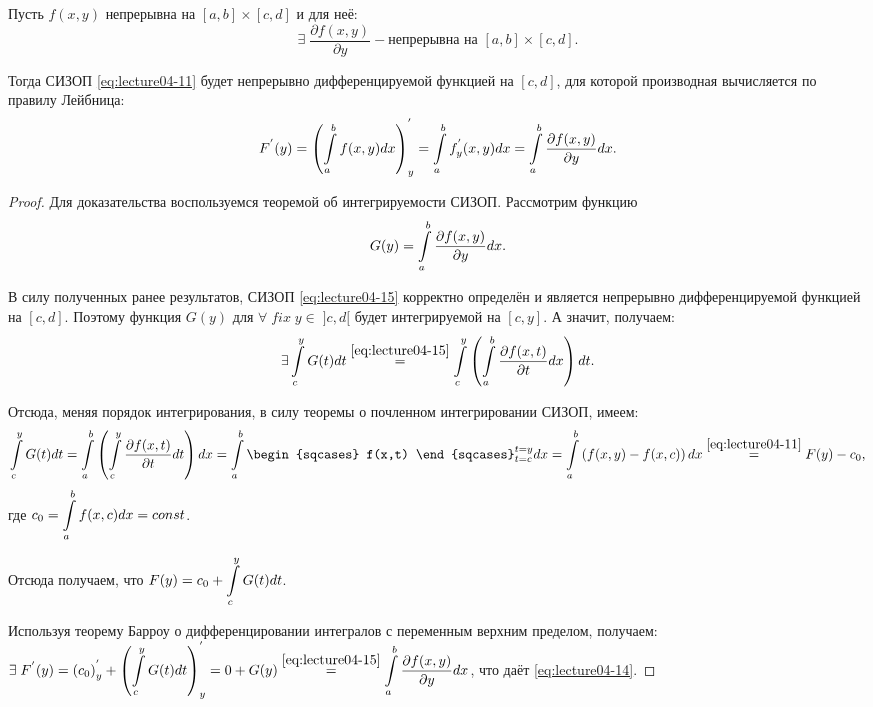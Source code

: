 \begin{col-answer-preambule}
\end{col-answer-preambule}

\begin{theorem}
	Пусть $f(x,y)$ непрерывна на $[a,b] \times [c,d]$ и для неё:
	\begin{equation*}
	\exists \; \dfrac{\partial f(x,y)}{\partial y} - \text{непрерывна на $[a,b] \times [c,d]$}.
	\end{equation*}
	
	Тогда СИЗОП \eqref{eq:lecture04-11} будет непрерывно дифференцируемой функцией на $[c,d]$, для которой производная вычисляется по правилу Лейбница:
	\begin{equation}
	\label{eq:lecture04-14}
	F^{'}(y) = \left(\displaystyle\int\limits_a^b f(x,y) dx\right)^{'}_y = \displaystyle\int\limits_a^b f^{'}_{y}(x,y)dx = \displaystyle\int\limits_a^b \dfrac{\partial f(x,y)}{\partial y} dx.
	\end{equation}
\end{theorem}
\begin{proof}
	Для доказательства воспользуемся теоремой об интегрируемости СИЗОП. Рассмотрим функцию
	\begin{equation}
	\label{eq:lecture04-15}
	G(y) = \displaystyle\int\limits_a^b \dfrac{\partial f(x,y)}{\partial y} dx.
	\end{equation}
	
	В силу полученных ранее результатов, СИЗОП \eqref{eq:lecture04-15} корректно определён и является непрерывно дифференцируемой функцией на $[c,d]$. Поэтому функция $G(y)$ для $\forall \; fix \; y \in \; ]c,d[$ будет интегрируемой на $[c,y]$. А значит, получаем:
	\begin{equation*}
	\exists \displaystyle\int\limits_c^y G(t)dt \overset{\eqref{eq:lecture04-15}}{=} \displaystyle\int\limits_c^y \left(\displaystyle\int\limits_a^b  \dfrac{\partial f(x,t)}{\partial t} dx \right) dt.
	\end{equation*}
	
	Отсюда, меняя порядок интегрирования, в силу теоремы о почленном интегрировании СИЗОП, имеем:
	\begin{equation*}
	\dintl_c^y G(t)dt = \dintl_a^b \left(\dintl_c^y \dfrac{\partial f(x,t)}{\partial t} dt\right) dx = \dintl_a^b \begin{sqcases} f(x,t) \end{sqcases}_{t = c}^{t = y}dx = \dintl_a^b \left(f(x,y) - f(x,c)\right) dx \overset{\eqref{eq:lecture04-11}}{=} F(y) - c_0,
	\end{equation*}
	где $c_0 = \displaystyle\int\limits_a^b f(x,c)dx = const$.
	
	Отсюда получаем, что $F(y) = c_0 + \displaystyle\int\limits_c^y G(t)dt$.
	
	Используя теорему Барроу о дифференцировании интегралов с переменным верхним пределом, получаем: \newline	 $\exists \; F^{'}(y) = \left(c_0\right)^{'}_{y} + \left(\displaystyle\int\limits_c^y G(t) dt\right)^{'}_{y} = 0 + G(y) \overset{\eqref{eq:lecture04-15}}{=} \displaystyle\int\limits_a^b \dfrac{\partial f(x,y)}{\partial y} dx$, что даёт \eqref{eq:lecture04-14}.
\end{proof}